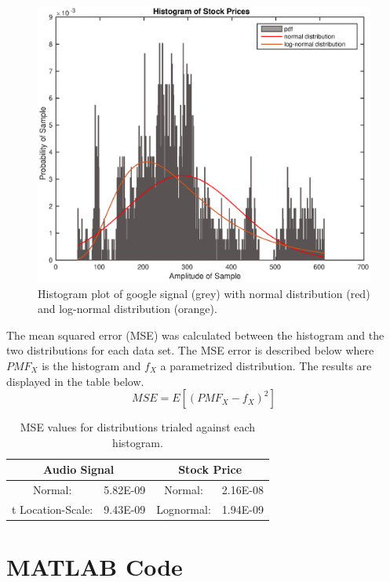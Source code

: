 \begin{figure}[H] %
	\centering 
	\includegraphics[width=\linewidth]{google_plot}
	\caption{Histogram plot of google signal (grey) with normal distribution (red) and log-normal distribution (orange).}
	\label{fig: google_plot} 
\end{figure}

The mean squared error (MSE) was calculated between the histogram and the two distributions for each data set. The MSE error is described below where $PMF_X$ is the histogram and $f_X$ a parametrized distribution. The results are displayed in the table below. 
\begin{equation}
MSE = E\left[(PMF_X - f_X)^2\right]
\end{equation}
\begin{table}[htbp]
  \centering
    \begin{tabular}{cccc}
    \toprule
    \multicolumn{2}{c}{Audio Signal  } & \multicolumn{2}{c}{Stock Price} \\
    \midrule
    Normal: & 5.82E-09 & Normal:  & 2.16E-08 \\
    t Location-Scale:  & 9.43E-09 & Lognormal: & 1.94E-09 \\
    \bottomrule
    \end{tabular}%
  \caption{MSE values for distributions trialed against each histogram.}
  \label{tab: tab1}%
\end{table}%


\section{MATLAB Code} 


